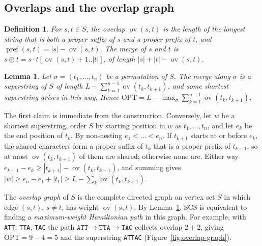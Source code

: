 \documentclass[11pt,a4paper]{article}   %
\makeatletter
\renewenvironment{proof}[1][\proofname]{\par
  \pushQED{\qed}%
  \normalfont \topsep1\p@\@plus1\p@\relax
  \trivlist
  \item[\hskip\labelsep\itshape #1\@addpunct{.}]\ignorespaces
}{\popQED\endtrivlist\@endpefalse}
\theoremstyle{compact}
\newtheorem{lemma}[theorem]{Lemma}
\theoremstyle{compactdef}
\newtheorem{definition}[theorem]{Definition}
\newcommand{\OPT}{\mathrm{OPT}}
\newcommand{\ov}{\operatorname{ov}}         %
\newcommand{\str}[1]{\texttt{#1}}           %
\makeatother
\begin{document}
\subsection{Overlaps and the overlap graph}

\begin{definition}
For $s,t\in S$, the \emph{overlap} $\ov(s,t)$ is the length of the longest
string that is both a proper suffix of $s$ and a proper prefix of $t$, and
$\operatorname{pref}(s,t)=|s|-\ov(s,t)$. The \emph{merge} of $s$ and $t$
is $s\oplus t=s\cdot t[\ov(s,t)+1..|t|]$, of length
$|s|+|t|-\ov(s,t)$.
\end{definition}

\begin{lemma}\label{lem:perm}
Let $\sigma=(t_1,\ldots,t_n)$ be a permutation of $S$.
The merge along $\sigma$ is a superstring of $S$ of length
$L-\sum_{k=1}^{n-1}\ov(t_k,t_{k+1})$, and some shortest superstring
arises in this way. Hence
$\OPT = L-\max_{\sigma}\sum_{k=1}^{n-1}\ov(t_k,t_{k+1})$.
\end{lemma}

\begin{proof}
The first claim is immediate from the construction. Conversely, let $w$
be a shortest superstring, order $S$ by starting position in $w$ as
$t_1,\dots,t_n$, and let $e_k$ be the end position of $t_k$. By
non-nesting $e_1<\dots<e_n$. If $t_{k+1}$ starts at or before $e_k$, the
shared characters form a proper suffix of $t_k$ that is a proper prefix of
$t_{k+1}$, so at most $\ov(t_k,t_{k+1})$ of them are shared; otherwise none
are. Either way $e_{k+1}-e_k\ge |t_{k+1}|-\ov(t_k,t_{k+1})$, and summing
gives $|w|\ge e_n-e_1+|t_1|\ge L-\sum_k\ov(t_k,t_{k+1})$.
\end{proof}

The \emph{overlap graph} of $S$ is the complete directed graph on vertex
set $S$ in which edge $(s,t)$, $s\ne t$, has weight $\ov(s,t)$. By
Lemma~\ref{lem:perm}, SCS is equivalent to finding a \emph{maximum-weight
Hamiltonian path} in this graph. For example, with \str{ATT}, \str{TTA},
\str{TAC} the path $\str{ATT}\to\str{TTA}\to\str{TAC}$ collects overlap
$2+2$, giving $\OPT=9-4=5$ and the superstring \str{ATTAC}
(Figure~\ref{fig:overlap-graph}).
\end{document}
